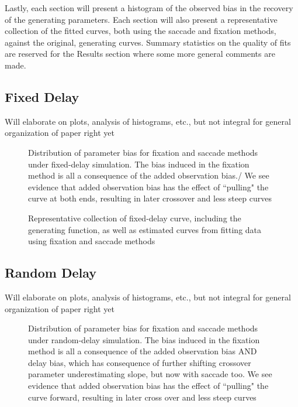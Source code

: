 \documentclass{article}
\begin{document}
Lastly, each section will present a histogram of the observed bias in the recovery of the generating parameters. Each section will also present a representative collection of the fitted curves, both using the saccade and fixation methods, against the original, generating curves. Summary statistics on the quality of fits are reserved for the Results section where some more general comments are made. 


\subsection{Fixed Delay}

Will elaborate on plots, analysis of histograms, etc., but not integral for general organization of paper right yet


\begin{figure}[H]
    \centering
    \caption{Distribution of parameter bias for fixation and saccade methods under fixed-delay simulation. The bias induced in the fixation method is all a consequence of the added observation bias./ We see evidence that added observation bias has the effect of ``pulling" the curve at both ends, resulting in later crossover and less steep curves}
\label{fig:fixed_par_bias}
\end{figure}




\begin{figure}[H]
\centering
\caption{Representative collection of fixed-delay curve, including  the generating function, as well as estimated curves from fitting data using fixation and saccade methods}
\label{fig:fixed_pb_curves}
\end{figure}

\subsection{Random Delay}


Will elaborate on plots, analysis of histograms, etc., but not integral for general organization of paper right yet


\begin{figure}[H]
    \centering
\caption{Distribution of parameter bias for fixation and saccade methods under random-delay simulation. The bias induced in the fixation method is all a consequence of the added observation bias AND delay bias, which has consequence of further shifting crossover parameter underestimating slope, but now with saccade too. We see evidence that added observation bias has the effect of ``pulling" the curve forward, resulting in later cross over and less steep curves}
\label{fig:random_par_bias}
\end{figure}
\end{document}
